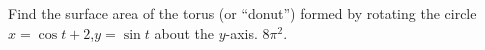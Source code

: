 {Find the surface area of the torus (or ``donut'') formed by rotating the circle $x=\cos t+2$,\quad $y=\sin t$ about the $y$-axis.
}
{$8\pi^2$.}
